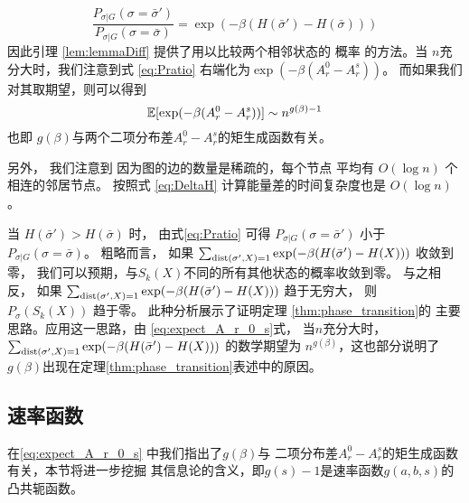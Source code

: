 \begin{equation}\label{eq:Pratio}
\frac{P_{\sigma |G } (\sigma = \bar{\sigma}')}{P_{\sigma |G } (\sigma = \bar{\sigma})}
= \exp(-\beta(H(\bar{\sigma}') - H(\bar{\sigma})))
\end{equation}
因此引理 \ref{lem:lemmaDiff} 提供了用以比较两个相邻状态的    概率
的方法。当 $n$充分大时，我们注意到式
\eqref{eq:Pratio} 右端化为$\exp(-\beta (A_r^0 - A_r^s))$。
而如果我们对其取期望，则可以得到
\begin{equation}\label{eq:expect_A_r_0_s}
	\operatorname{\mathbb{E}}[\exp(-\beta (A_r^0 - A_r^s))] \sim n^{g(\beta)-1}
\end{equation}
也即 $g(\beta)$与两个二项分布差$A_r^0 - A_r^s$的矩生成函数有关。



另外， 我们注意到 因为图的边的数量是稀疏的，每个节点
平均有 $O(\log n)$ 个相连的邻居节点。
按照式 \eqref{eq:DeltaH} 
计算能量差的时间复杂度也是 $O(\log n)$。

当 $H(\bar{\sigma}') > H(\bar{\sigma})$ 时， 
由式\eqref{eq:Pratio} 可得
$P_{\sigma | G}(\sigma = \bar{\sigma}')$
小于
$P_{\sigma | G}(\sigma = \bar{\sigma})$。
粗略而言， 如果
$ \sum_{\operatorname{dist}(\sigma', X)=1}\exp(-\beta(H(\bar{\sigma}') - H(X))) $
收敛到零，
我们可以预期，与$S_k(X)$不同的所有其他状态的概率收敛到零。
与之相反， 如果
$ \sum_{\operatorname{dist}(\sigma', X)=1}\exp(-\beta(H(\bar{\sigma}') - H(X))) $
趋于无穷大，
则 $P_{\sigma}(S_k(X))$ 趋于零。
此种分析展示了证明定理 \ref{thm:phase_transition}的
主要思路。应用这一思路，由
\eqref{eq:expect_A_r_0_s}式，
当$n$充分大时，$ \sum_{\operatorname{dist}(\sigma', X)=1}\exp(-\beta(H(\bar{\sigma}') - H(X))) $
的数学期望为 $n^{g(\beta)}$，这也部分说明了
$g(\beta)$出现在定理\ref{thm:phase_transition}表述中的原因。
\subsection{速率函数}\label{sub:rate_function}
在\eqref{eq:expect_A_r_0_s} 中我们指出了$g(\beta)$与
二项分布差$A_r^0 - A_r^s$的矩生成函数有关，本节将进一步挖掘
其信息论的含义，即$g(s)-1$是速率函数$g(a,b,s)$的凸共轭函数。

